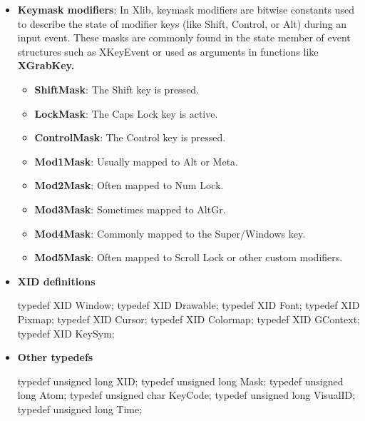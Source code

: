 \documentclass{report}
\begin{document}
    \pagebreak 
    \begin{itemize}
        \item \textbf{Keymask modifiers}: In Xlib, keymask modifiers are bitwise constants used to describe the state of modifier keys (like Shift, Control, or Alt) during an input event. These masks are commonly found in the state member of event structures such as XKeyEvent or used as arguments in functions like \textbf{XGrabKey.}
            \begin{itemize}
                \item \textbf{ShiftMask}: The Shift key is pressed.
                \item \textbf{LockMask}: The Caps Lock key is active.
                \item \textbf{ControlMask}: The Control key is pressed.
                \item \textbf{Mod1Mask}: Usually mapped to Alt or Meta.
                \item \textbf{Mod2Mask}: Often mapped to Num Lock.
                \item \textbf{Mod3Mask}: Sometimes mapped to AltGr.
                \item \textbf{Mod4Mask}: Commonly mapped to the Super/Windows key.
                \item \textbf{Mod5Mask}: Often mapped to Scroll Lock or other custom modifiers.
            \end{itemize}

    \end{itemize}

    \pagebreak 
    \begin{itemize}
        \item \textbf{XID definitions} 
            \bigbreak \noindent 
            \begin{cppcode}
                typedef XID Window;
                typedef XID Drawable;
                typedef XID Font;
                typedef XID Pixmap;
                typedef XID Cursor;
                typedef XID Colormap;
                typedef XID GContext;
                typedef XID KeySym;
            \end{cppcode}
    \end{itemize}

    \pagebreak 
    \begin{itemize}
        \item \textbf{Other typedefs}
            \bigbreak \noindent 
            \begin{cppcode}
            typedef unsigned long XID;
            typedef unsigned long Mask;
            typedef unsigned long Atom;		
            typedef unsigned char KeyCode;
            typedef unsigned long VisualID;
            typedef unsigned long Time;
            \end{cppcode}
    \end{itemize}
\end{document}
